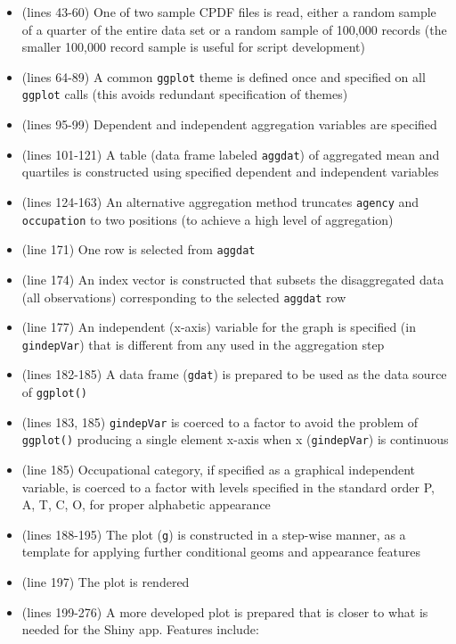 \documentclass[10pt, letterpaper]{article}
\begin{document}
\begin{spacing}{1.0}
\begin{itemize}
    \item (lines 43-60) One of two sample CPDF files is read, either a random sample of a quarter of the entire data set or a random sample of 100,000 records (the smaller 100,000 record sample is useful for script development)
    \item (lines 64-89) A common \texttt{ggplot} theme is defined once and specified on all \texttt{ggplot} calls (this avoids redundant specification of themes)
    \item (lines 95-99) Dependent and independent aggregation variables are specified
    \item (lines 101-121) A table (data frame labeled \texttt{aggdat}) of aggregated mean and quartiles is constructed using specified dependent and independent variables
    \item (lines 124-163) An alternative aggregation method truncates \texttt{agency} and \texttt{occupation} to two positions (to achieve a high level of aggregation)
    \item (line 171) One row is selected from \texttt{aggdat}
    \item (line 174) An index vector is constructed that subsets the disaggregated data (all observations) corresponding to the selected \texttt{aggdat} row
    \item (line 177) An independent (x-axis) variable for the graph is specified (in \texttt{gindepVar}) that is different from any used in the aggregation step
    \item (lines 182-185) A data frame (\texttt{gdat}) is prepared to be used as the data source of \texttt{ggplot()}
    \item (lines 183, 185) \texttt{gindepVar} is coerced to a factor to avoid the problem of \texttt{ggplot()} producing a single element x-axis when x (\texttt{gindepVar}) is continuous
    \item(line 185)  Occupational category, if specified as a graphical independent variable, is coerced to a factor with levels specified in the standard order P, A, T, C, O, for proper alphabetic appearance
    \item (lines 188-195) The plot (\texttt{g}) is constructed in a step-wise manner, as a template for applying further conditional geoms and appearance features
    \item (line 197) The plot is rendered
    \item (lines 199-276) A more developed plot is prepared that is closer to what is needed for the Shiny app.  Features include:

\end{itemize}
\end{spacing}
\end{document}
